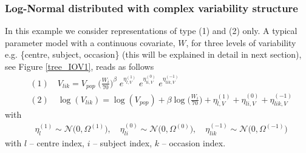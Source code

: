 
\subsubsection{Log-Normal distributed with complex variability structure}
\label{subsec:logIOVCovariate}
In this example we consider representations of type (1) and (2) only. A typical parameter model with a continuous covariate, $W$, for three levels of variability e.g. \{centre, subject, occasion\} (this will be explained in detail in next section), see Figure \ref{tree_IOV1}, reads as follows
\begin{align*}
&(1)\quad V_{lik} = V_{pop} \; \big(\frac{W_i}{70}\big)^\beta \; e^{\eta_{l,V}^{(1)}} \; e^{\eta_{li,V}^{(0)}} \; e^{\eta_{lik,V}^{(-1)}}   \\
&(2)\quad \log(V_{lik}) = \log(V_{pop}) + \beta\log\Big(\frac{W_i}{70}\Big) + \eta_{l,V}^{(1)} + \eta_{li,V}^{(0)} + \eta_{lik,V}^{(-1)}
\end{align*}
with
\begin{align*}
 & \eta_l^{(1)} \sim \mathcal{N}\big(0,\Omega^{(1)}\big), \quad \eta_{li}^{(0)} \sim \mathcal{N}\big(0,\Omega^{(0)}\big),
\quad \eta_{lik}^{(-1)} \sim \mathcal{N}\big(0,\Omega^{(-1)}\big)
\end{align*}
with $l$ -- centre index, $i$ -- subject index, $k$ -- occasion index.


